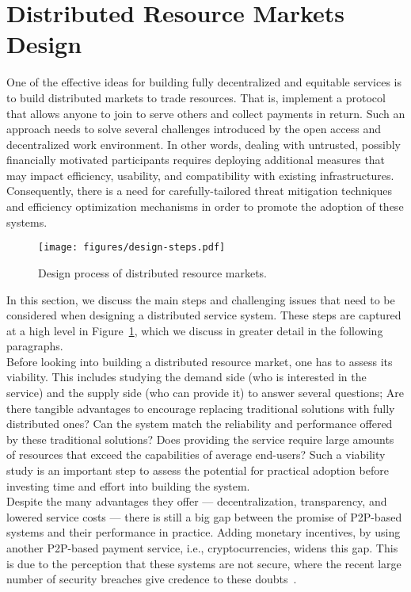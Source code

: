 \documentclass{llncs}
\begin{document}
\section{Distributed Resource Markets Design}
One of the effective ideas for building fully decentralized and equitable services is to build distributed markets to trade resources. That is, implement a protocol that allows anyone to join to serve others and collect payments in return. Such an approach needs to solve several challenges introduced by the open access and decentralized work environment. In other words, dealing with untrusted, possibly financially motivated participants requires deploying additional measures that may impact efficiency, usability, and compatibility with existing infrastructures. Consequently, there is a need for carefully-tailored threat mitigation techniques and efficiency optimization mechanisms in order to promote the adoption of these systems.


\begin{figure}[ht!]
\centerline{
\texttt{[image: figures/design-steps.pdf]}}
\caption{Design process of distributed resource markets.} \label{design-steps}
\vspace{-12pt}
\end{figure}


In this section, we discuss the main steps and challenging issues that need to be considered when designing a distributed service system. These steps are captured at a high level in Figure~\ref{design-steps}, which we discuss in greater detail in the following paragraphs. \\


 Before looking into building a distributed resource market, one has to assess its viability. This includes studying the demand side (who is interested in the service) and the supply side (who can provide it) to answer several questions; Are there tangible advantages to encourage replacing traditional solutions with fully distributed ones? Can the system match the reliability and performance offered by these traditional solutions? Does providing the service require large amounts of resources that exceed the capabilities of average end-users? Such a viability study is an important step to assess the potential for practical adoption before investing time and effort into building the system. \\


 Despite the many advantages they offer — decentralization, transparency, and lowered service costs — there is still a big gap between the promise of P2P-based systems and their performance in practice. Adding monetary incentives, by using another P2P-based payment service, i.e., cryptocurrencies, widens this gap. This is due to the perception that these systems are not secure, where the recent large number of security breaches give credence to these doubts~\cite{benebit-scam,binance-hack,bitcoin-cash-hack,bitcoingold-double-spending,exchange-hack-b,bitfloor-hack,korea-exchange-hack,eth-hack,ico-hack-b,exchange-hack,enigma-hack,mine-hack}.
\end{document}

